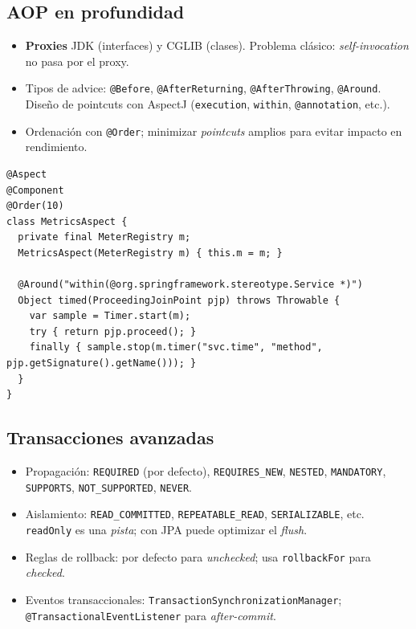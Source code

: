 \documentclass[11pt,a4paper]{article}
\begin{document}
\subsection{AOP en profundidad}
\begin{itemize}[leftmargin=*]
  \item \textbf{Proxies} JDK (interfaces) y CGLIB (clases). Problema clásico: \emph{self-invocation} no pasa por el proxy.
  \item Tipos de advice: \texttt{@Before}, \texttt{@AfterReturning}, \texttt{@AfterThrowing}, \texttt{@Around}. Diseño de pointcuts con AspectJ (\texttt{execution}, \texttt{within}, \texttt{@annotation}, etc.).
  \item Ordenación con \texttt{@Order}; minimizar \emph{pointcuts} amplios para evitar impacto en rendimiento.
\end{itemize}

\begin{lstlisting}[style=javastyle, caption={Aspecto de métricas con @Around}]
@Aspect
@Component
@Order(10)
class MetricsAspect {
  private final MeterRegistry m;
  MetricsAspect(MeterRegistry m) { this.m = m; }

  @Around("within(@org.springframework.stereotype.Service *)")
  Object timed(ProceedingJoinPoint pjp) throws Throwable {
    var sample = Timer.start(m);
    try { return pjp.proceed(); }
    finally { sample.stop(m.timer("svc.time", "method", pjp.getSignature().getName())); }
  }
}
\end{lstlisting}

\subsection{Transacciones avanzadas}
\begin{itemize}[leftmargin=*]
  \item Propagación: \texttt{REQUIRED} (por defecto), \texttt{REQUIRES\_NEW}, \texttt{NESTED}, \texttt{MANDATORY}, \texttt{SUPPORTS}, \texttt{NOT\_SUPPORTED}, \texttt{NEVER}.
  \item Aislamiento: \texttt{READ\_COMMITTED}, \texttt{REPEATABLE\_READ}, \texttt{SERIALIZABLE}, etc. \texttt{readOnly} es una \emph{pista}; con JPA puede optimizar el \emph{flush}.
  \item Reglas de rollback: por defecto para \emph{unchecked}; usa \texttt{rollbackFor} para \emph{checked}.
  \item Eventos transaccionales: \texttt{TransactionSynchronizationManager}; \texttt{@TransactionalEventListener} para \emph{after-commit}.
\end{itemize}
\end{document}
